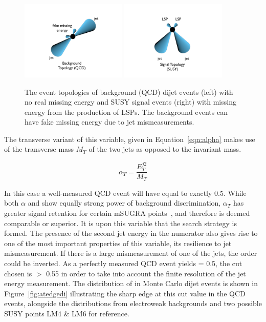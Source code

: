 \begin{figure}[htbp]
\centering
\includegraphics[width=0.45\textwidth,trim=5.5cm 2.5cm 5.5cm 2.5cm, clip=true]{Figures/AlphaT/forZ2.pdf}
\includegraphics[width=0.45\textwidth,trim=5cm 2.5cm 6cm 2.5cm, clip=true]{Figures/AlphaT/forZ1.pdf}
\caption[The event topologies of background (QCD) dijet events (left) with no real missing energy and SUSY signal events (right) with missing energy from the production of LSPs.]{\label{fig:attop}The event topologies of background (QCD) dijet events (left) with no real missing energy and SUSY signal events (right) with missing energy from the production of LSPs. The background events can have fake missing energy due to jet mismeasurements.}
\end{figure}



The transverse variant of this variable, given in Equation~\ref{eqn:alpha} makes use of the transverse mass $M_{T}$ of the two jets as opposed to the invariant mass.

\begin{equation}
\alpha_{T} = \frac{E_{T}^{j2}}{M_{T}} 
\label{eqn:alphat}
\end{equation}

In this case a well-measured QCD event will have \alt equal to exactly 0.5. While both $\alpha$ and \alt show equally strong power of background discrimination, $\alpha_{T}$ has greater signal retention for certain mSUGRA points~\cite{PASaT}, and therefore is deemed comparable or superior. It is upon this variable that the search strategy is formed. The presence of the second jet energy in the numerator also gives rise to one of the most important properties of this variable, its resilience to jet mismeasurement. If there is a large mismeasurement of one of the jets, the order could be inverted. As a perfectly measured QCD event yields \alt = 0.5, the cut chosen is \alt $>$ 0.55 in order to take into account the finite resolution of the jet energy measurement.  The distribution of \alt in Monte Carlo dijet events is shown in Figure~\ref{fig:atedgedi} illustrating the sharp edge at this cut value in the QCD events, alongside the distributions from electroweak backgrounds and two possible SUSY points LM4 \& LM6 for reference.


